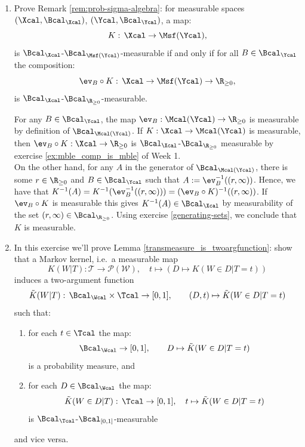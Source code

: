 \begin{enumerate}[label=2.\arabic*]
    \item\label{ex:measurability} Prove Remark \ref*{rem:prob-sigma-algebra}: for measurable spaces $(\Xcal,\Bcal_\Xcal)$, $(\Ycal,\Bcal_\Ycal)$, a map:
    \[ K:\, \Xcal \to \Msf(\Ycal),\]
    is $\Bcal_\Xcal$-$\Bcal_{\Msf(\Ycal)}$-measurable if and only if for all $B \in \Bcal_\Ycal$ the composition:
    \[ \ev_B \circ K:\, \Xcal \to \Msf(\Ycal) \to \R_{\ge 0},   \]
    is $\Bcal_\Xcal$-$\Bcal_{\R_{\ge 0}}$-measurable.
    \begin{ungradedsolution}
        For any $B\in\Bcal_{\Ycal}$, the map $\ev_B:\Mcal(\Ycal)\to \R_{\geq 0}$ is measurable by definition of $\Bcal_{\Mcal(\Ycal)}$.
        If $K:\Xcal \to \Mcal(\Ycal)$ is measurable, then $\ev_B \circ K : \Xcal \to \R_{\geq 0}$ is $\Bcal_{\Xcal}$-$\Bcal_{\R_{\geq 0}}$ measurable by exercise \ref*{ex:mble_comp_is_mble} of Week 1. \\
        On the other hand, for any $A$ in the generator of $\Bcal_{\Mcal(\Ycal)}$, there is some $r\in\R_{\geq 0}$ and $B\in \Bcal_{\Ycal}$ such that $A:= \ev_B^{-1}((r, \infty))$. Hence, we have that $K^{-1}(A) = K^{-1}(\ev_B^{-1}((r, \infty))) = (\ev_B \circ K)^{-1}((r, \infty))$. If $\ev_B \circ K$ is measurable this gives $K^{-1}(A)\in \Bcal_{\Xcal}$ by measurability of the set $(r, \infty)\in \Bcal_{\R_{\geq0}}$. Using exercise \ref{generating-sets}, we conclude that $K$ is measurable.
    \end{ungradedsolution}

    \item \label{ex:markov_kernel_is_bivariate_function} %
    In this exercise we'll prove Lemma \ref*{transmeasure_is_twoargfunction}: show that a Markov kernel, i.e.\ a measurable map
    \[ K(W|T): \mathcal{T}\rightarrow \mathcal{P}(\mathcal{W}), \quad t\mapsto (D\mapsto K(W\in D|T=t)) \]
    induces a two-argument function
    \[ \tilde K(W|T):\, \Bcal_\Wcal \times \Tcal \to [0,1], \qquad (D,t) \mapsto \tilde K(W \in D|T=t) \]
    such that:
    \begin{enumerate}[label=\roman*)]
        \item for each $t \in \Tcal$ the map:
        \[ \Bcal_\Wcal \to [0,1],\qquad D \mapsto \tilde K(W\in D|T=t)\]
        is a probability measure, and
        \item for each $D \in \Bcal_\Wcal$ the map:
        \[ \tilde K(W \in D|T):\, \Tcal \to [0,1],\quad t \mapsto \tilde K(W \in D|T=t) \]
        is $\Bcal_\Tcal$-$\Bcal_{[0,1]}$-measurable
    \end{enumerate}
    and vice versa.


\end{enumerate}
